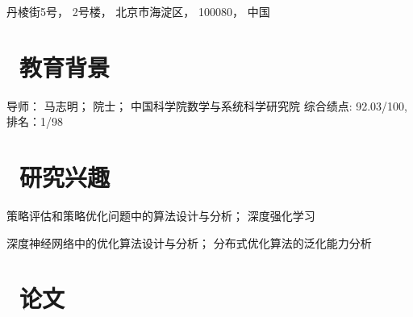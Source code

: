 \documentclass{resume}
\begin{document}


\centerline{\faMap 丹棱街5号， 2号楼， 北京市海淀区， 100080， 中国}
 
\section{\faGraduationCap\  教育背景}
导师： 马志明； 院士； 中国科学院数学与系统科学研究院
{综合绩点: 92.03/100, 排名：1/98}

\section{\faUsers\ 研究兴趣}
 

 {}
策略评估和策略优化问题中的算法设计与分析； 深度强化学习 

 {}
深度神经网络中的优化算法设计与分析； 分布式优化算法的泛化能力分析
 


\section{\faBook\ 论文}
\end{document}
